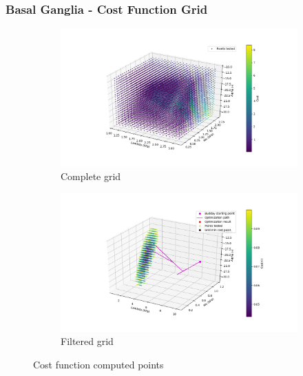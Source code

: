 \documentclass{beamer}
\begin{document}
\begin{frame}
\frametitle{Basal Ganglia - Cost Function Grid}
\begin{figure}[h!]
\centering
\begin{subfigure}[t]{0.5\linewidth}
\centering
\includegraphics[width = 1.\linewidth, trim = 80 50 50 50]
{Pictures/BasalGangliaCompleteGrid}
\caption{Complete grid}
\end{subfigure}%
\begin{subfigure}[t]{0.5\linewidth}
\centering
\includegraphics[width = 1.\textwidth, trim = 50 50 80 50]
{Pictures/BasalGangliaFilteredGrid}
\caption{Filtered grid}
\end{subfigure}
\caption{Cost function computed points}
\end{figure}
\end{frame}
\end{document}
